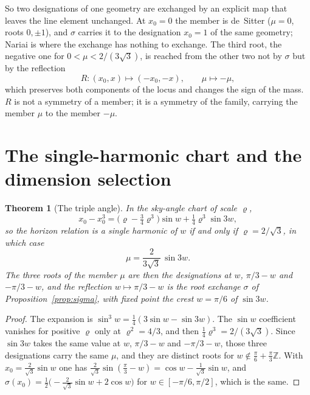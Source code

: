 \documentclass[11pt]{article}
\theoremstyle{plain}
\newtheorem{theorem}{Theorem}
\theoremstyle{definition}
\theoremstyle{remark}
\begin{document}
So two designations of one geometry are exchanged by an explicit map that leaves the line element unchanged.
At $x_{0}=0$ the member is de~Sitter ($\mu=0$, roots $0,\pm1$), and $\sigma$ carries it to the designation $x_{0}=1$
of the same geometry; Nariai is where the exchange has nothing to exchange. The third root, the negative one for
$0<\mu<2/(3\sqrt3)$, is reached from the other two not by $\sigma$ but by the reflection
\begin{equation}\label{eq:R}
R:(x_{0},x)\mapsto(-x_{0},-x),\qquad \mu\mapsto-\mu,
\end{equation}
which preserves both components of the locus and changes the sign of the mass. $R$ is not a symmetry of a
member; it is a symmetry of the family, carrying the member $\mu$ to the member $-\mu$.

\section{The single-harmonic chart and the dimension selection}\label{sec:triple}

\begin{theorem}[The triple angle]\label{thm:triple}
In the sky-angle chart of scale $\varrho$,
\[
x_{0}-x_{0}^{3}=\bigl(\varrho-\tfrac34\varrho^{3}\bigr)\sin w+\tfrac14\varrho^{3}\sin 3w ,
\]
so the horizon relation is a single harmonic of $w$ if and only if $\varrho=2/\sqrt3$, in which case
\begin{equation}\label{eq:triple}
\mu=\frac{2}{3\sqrt3}\,\sin 3w .
\end{equation}
The three roots of the member $\mu$ are then the designations at $w$, $\pi/3-w$ and $-\pi/3-w$, and the
reflection $w\mapsto\pi/3-w$ is the root exchange $\sigma$ of Proposition~\ref{prop:sigma}, with fixed point the
crest $w=\pi/6$ of $\sin3w$.
\end{theorem}

\begin{proof}
The expansion is $\sin^{3}w=\tfrac14(3\sin w-\sin3w)$. The $\sin w$ coefficient vanishes for positive $\varrho$
only at $\varrho^{2}=4/3$, and then $\tfrac14\varrho^{3}=2/(3\sqrt3)$. Since $\sin3w$ takes the same value at $w$,
$\pi/3-w$ and $-\pi/3-w$, those three designations carry the same $\mu$, and they are distinct roots for
$w\notin\tfrac{\pi}{6}+\tfrac{\pi}{3}\mathbb{Z}$. With $x_{0}=\tfrac{2}{\sqrt3}\sin w$ one has
$\tfrac{2}{\sqrt3}\sin(\tfrac{\pi}{3}-w)=\cos w-\tfrac{1}{\sqrt3}\sin w$, and
$\sigma(x_{0})=\tfrac12\bigl(-\tfrac{2}{\sqrt3}\sin w+2\cos w\bigr)$ for $w\in[-\pi/6,\pi/2]$, which is the same.
\end{proof}
\end{document}

